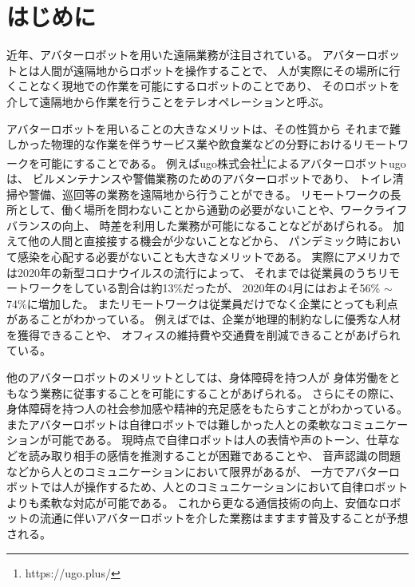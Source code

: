 \documentclass{kuisthesis}
\begin{document}
\tableofcontents



\section{はじめに} %
\label{sec: はじめに} %
近年、アバターロボットを用いた遠隔業務が注目されている。
アバターロボットとは人間が遠隔地からロボットを操作することで、
人が実際にその場所に行くことなく現地での作業を可能にするロボットのことであり、
そのロボットを介して遠隔地から作業を行うことをテレオペレーションと呼ぶ。

アバターロボットを用いることの大きなメリットは、その性質から
それまで難しかった物理的な作業を伴うサービス業や飲食業などの分野におけるリモートワークを可能にすることである。
例えばugo株式会社\footnote{https://ugo.plus/}によるアバターロボットugoは、
ビルメンテナンスや警備業務のためのアバターロボットであり、
トイレ清掃や警備、巡回等の業務を遠隔地から行うことができる。
リモートワークの長所として、働く場所を問わないことから通勤の必要がないことや、ワークライフバランスの向上、
時差を利用した業務が可能になることなどがあげられる。
加えて他の人間と直接接する機会が少ないことなどから、
パンデミック時において感染を心配する必要がないことも大きなメリットである。
実際にアメリカでは2020年の新型コロナウイルスの流行によって、
それまでは従業員のうちリモートワークをしている割合は約13\%だったが、
2020年の4月にはおよそ56\% $\sim$ 74\%に増加した\cite{ozimek2020future}。
またリモートワークは従業員だけでなく企業にとっても利点があることがわかっている。
例えば\cite{FERREIRA202170}では、企業が地理的制約なしに優秀な人材を獲得できることや、
オフィスの維持費や交通費を削減できることがあげられている。

他のアバターロボットのメリットとしては、身体障碍を持つ人が
身体労働をともなう業務に従事することを可能にすることがあげられる。
さらにその際に、身体障碍を持つ人の社会参加感や精神的充足感をもたらすことがわかっている\cite{takeuchi2020avatar}。
またアバターロボットは自律ロボットでは難しかった人との柔軟なコミュニケーションが可能である。
現時点で自律ロボットは人の表情や声のトーン、仕草などを読み取り相手の感情を推測することが困難であることや、
音声認識の問題などから人とのコミュニケーションにおいて限界があるが、
一方でアバターロボットでは人が操作するため、人とのコミュニケーションにおいて自律ロボットよりも柔軟な対応が可能である。
これから更なる通信技術の向上、安価なロボットの流通に伴いアバターロボットを介した業務はますます普及することが予想される。
\end{document}
